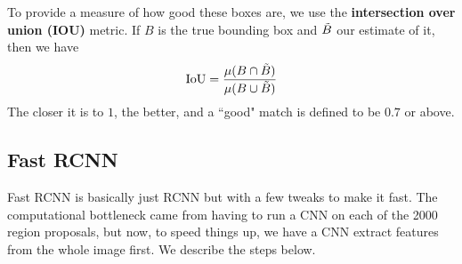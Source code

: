   \begin{definition}[IOU]
  To provide a measure of how good these boxes are, we use the \textbf{intersection over union (IOU)} metric. If $B$ is the true bounding box and $\Tilde{B}$ our estimate of it, then we have 
  \[\mathrm{IoU} = \frac{\mu(B \cap \Tilde{B})}{\mu(B \cup \Tilde{B})}\]
  The closer it is to $1$, the better, and a ``good" match is defined to be $0.7$ or above.  
  \end{definition} 

\subsection{Fast RCNN}

  Fast RCNN is basically just RCNN but with a few tweaks to make it fast. The computational bottleneck came from having to run a CNN on each of the 2000 region proposals, but now, to speed things up, we have a CNN extract features from the whole image first. We describe the steps below. 
